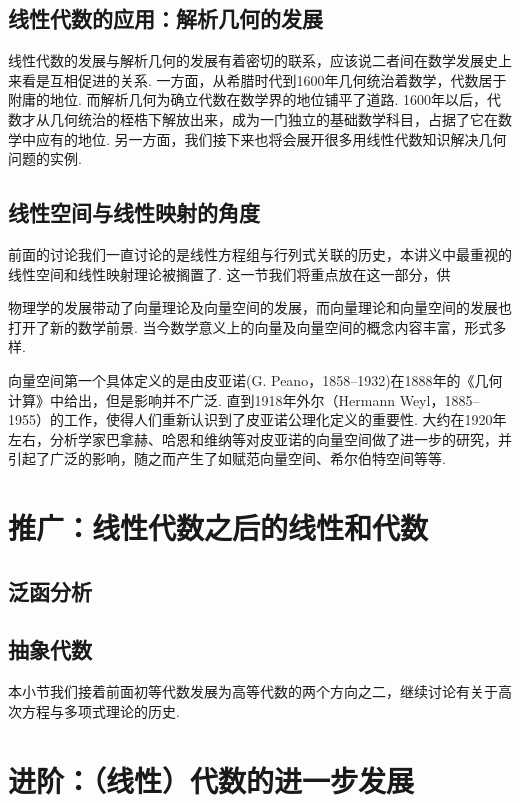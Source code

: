 \subsection{线性代数的应用：解析几何的发展}

线性代数的发展与解析几何的发展有着密切的联系，应该说二者间在数学发展史上来看是互相促进的关系. 一方面，从希腊时代到1600年几何统治着数学，代数居于附庸的地位. 而解析几何为确立代数在数学界的地位铺平了道路. 1600年以后，代数才从几何统治的桎梏下解放出来，成为一门独立的基础数学科目，占据了它在数学中应有的地位. 另一方面，我们接下来也将会展开很多用线性代数知识解决几何问题的实例.

\subsection{线性空间与线性映射的角度}

前面的讨论我们一直讨论的是线性方程组与行列式关联的历史，本讲义中最重视的线性空间和线性映射理论被搁置了. 这一节我们将重点放在这一部分，供

物理学的发展带动了向量理论及向量空间的发展，而向量理论和向量空间的发展也打开了新的数学前景. 当今数学意义上的向量及向量空间的概念内容丰富，形式多样.

向量空间第一个具体定义的是由皮亚诺(G. Peano，1858--1932)在1888年的《几何计算》中给出，但是影响并不广泛. 直到1918年外尔（Hermann Weyl，1885--1955）的工作，使得人们重新认识到了皮亚诺公理化定义的重要性. 大约在1920年左右，分析学家巴拿赫、哈恩和维纳等对皮亚诺的向量空间做了进一步的研究，并引起了广泛的影响，随之而产生了如赋范向量空间、希尔伯特空间等等.

\section{推广：线性代数之后的线性和代数}

\subsection{泛函分析}

\subsection{抽象代数}

本小节我们接着前面初等代数发展为高等代数的两个方向之二，继续讨论有关于高次方程与多项式理论的历史.

\section{进阶：（线性）代数的进一步发展}

